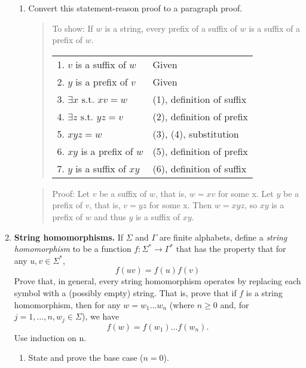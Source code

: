 \documentclass{article}
\newcommand{\s}{\Sigma}
\newcommand{\g}{\Gamma}
\newcommand{\newp}{\\[2mm]}
\begin{document}
\begin{enumerate}
\begin{enumerate}
        \item Convert this statement-reason proof to a paragraph proof.
        \begin{quote}
            To show: If $w$ is a string, every prefix of a suffix of $w$ is a suffix of a prefix of $w$.\newp
            \begin{tabular}{l l}
                1. $v$ is a suffix of $w$ & Given \\ 
                2. $y$ is a prefix of $v$ & Given \\ 
                3. $\exists x \text{ s.t. } xv = w$ & (1), definition of suffix \\ 
                4. $\exists z \text{ s.t. } yz = v$ & (2), definition of prefix \\ 
                5. $xyz = w$ & (3), (4), substitution \\ 
                6. $xy$ is a prefix of $w$ & (5), definition of prefix \\ 
                7. $y$ is a suffix of $xy$ & (6), definition of suffix \\ 
            \end{tabular}
        \end{quote}   
        \textcolor{red}{\begin{quote}
            Proof: 
            Let $v$ be a suffix of $w$, that is, $w=xv$ for some x.
            Let $y$ be a prefix of $v$, that is, $v=yz$ for some x.
            Then $w=xyz$, so $xy$ is a prefix of $w$ and thus $y$ is a suffix of $xy$.
        \end{quote}}
    \end{enumerate}
\newpage
    \item \textbf{String homomorphisms.} If $\s$ and $\g$ are finite alphabets, define a \textit{string homomorphism} to be a function $f : \s^* \rightarrow \g^*$ that has the property that for any $u, v \in \s^*$,
    \[f(uv)=f(u)f(v)\]
    Prove that, in general, every string homomorphism operates by replacing each symbol with a (possibly empty) string. That is, prove that if $f$ is a string homomorphism, then for any $w = w_1... w_n$ (where $n \geq 0$ and, for $j = 1, . . . , n,w_j \in \s$), we have
    \begin{equation}
        f(w) = f(w_1)...f(w_n). \tag{*}
    \end{equation}
    Use induction on n.
    \begin{enumerate}
        \item State and prove the base case ($n = 0$).\newp

\end{enumerate}
\end{enumerate}
\end{document}
